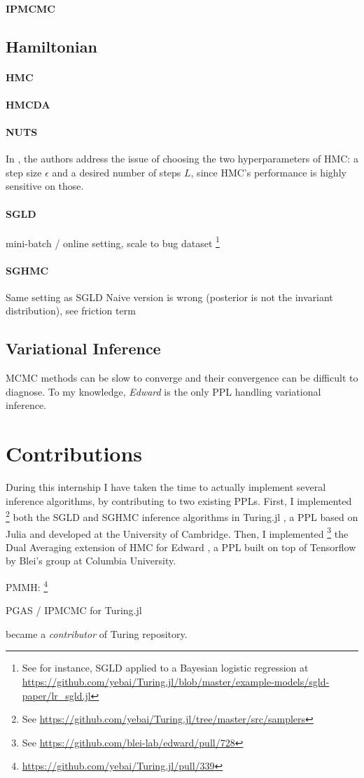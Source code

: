 \paragraph{IPMCMC}

\subsection{Hamiltonian}
\paragraph{HMC}


\paragraph{HMCDA}


\paragraph{NUTS}
In \cite{NUTS}, the authors address the issue of choosing the two hyperparameters of HMC: a step size $\epsilon$ and a desired number of steps $L$, since HMC’s performance is highly sensitive on those.
\cite{Nesterov2009}

\paragraph{SGLD}
mini-batch / online setting, scale to bug dataset
\footnote{See for instance, SGLD applied to a Bayesian logistic regression at \url{https://github.com/yebai/Turing.jl/blob/master/example-models/sgld-paper/lr_sgld.jl}}
 \cite{SGLD}

\paragraph{SGHMC}
Same setting as SGLD
Naive version is wrong (posterior is not the invariant distribution), see \cite{SGMCMC}
friction term
 \cite{SGHMC}
 
\subsection{Variational Inference}
MCMC methods can be slow to converge and their convergence can be difficult to diagnose.
To my knowledge, \emph{Edward} \cite{Edward} is the only \gls{PPL} handling variational inference.

\section{Contributions}
\quad During this internship I have taken the time to actually implement several inference algorithms, by contributing to two existing PPLs.
First, I implemented \footnote{See \url{https://github.com/yebai/Turing.jl/tree/master/src/samplers}} both the \gls{SGLD} and \gls{SGHMC} inference algorithms in Turing.jl \cite{Turing}, a PPL based on Julia and developed at the University of Cambridge.
Then, I implemented \footnote{See \url{https://github.com/blei-lab/edward/pull/728}} the Dual Averaging extension of HMC \cite{HMC} for Edward \cite{Edward}, a PPL built on top of Tensorflow \cite{Tensorflow} by Blei's group at Columbia University.

PMMH: \footnote{\url{https://github.com/yebai/Turing.jl/pull/339}}

PGAS / IPMCMC for Turing.jl

became a \textit{contributor} of Turing repository.
 

